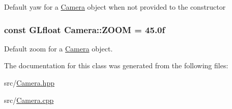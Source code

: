 Default yaw for a \hyperlink{classCamera}{Camera} object when not provided to the constructor \hypertarget{classCamera_a34cdfe4c17868880037d5ff78159f158}{
\subsubsection[{Z\-O\-O\-M}]{\setlength{\rightskip}{0pt plus 5cm}const G\-Lfloat Camera\-::\-Z\-O\-O\-M = 45.\-0f\hspace{0.3cm}{\ttfamily [static]}}}\label{classCamera_a34cdfe4c17868880037d5ff78159f158}
Default zoom for a \hyperlink{classCamera}{Camera} object. 

The documentation for this class was generated from the following files\-:\begin{DoxyCompactItemize}
\item 
src/\hyperlink{Camera_8hpp}{Camera.\-hpp}\item 
src/\hyperlink{Camera_8cpp}{Camera.\-cpp}\end{DoxyCompactItemize}
